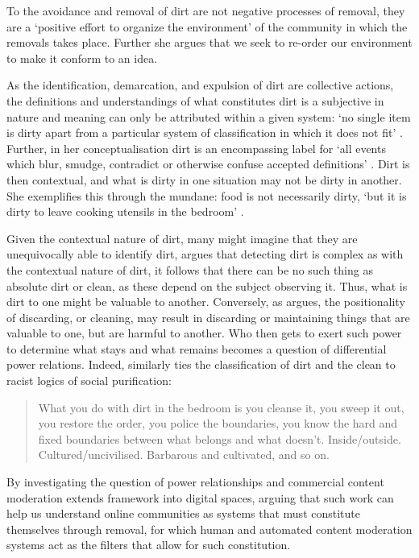 {To \citet{Douglas:1966} the avoidance and removal of dirt are not negative processes of removal, they are a `positive effort to organize the environment' \cite{Douglas:1966} of the community in which the removals takes place. Further she argues that we seek to re-order our environment to make it conform to an idea.

As the identification, demarcation, and expulsion of dirt are collective actions, the definitions and understandings of what constitutes dirt is a subjective in nature and meaning can only be attributed within a given system: `no single item is dirty apart from a particular system of classification in which it does not fit' \cite{Douglas:1966}. Further, in her conceptualisation dirt is an encompassing label for `all events which blur, smudge, contradict or otherwise confuse accepted definitions' \cite{Douglas:1966}. Dirt is then contextual, and what is dirty in one situation may not be dirty in another. She exemplifies this through the mundane: food is not necessarily dirty, `but it is dirty to leave cooking utensils in the bedroom' \cite{Douglas:1966}.

Given the contextual nature of dirt, many might imagine that they are unequivocally able to identify dirt, \citet{Douglas:1966} argues that detecting dirt is complex as with the contextual nature of dirt, it follows that there can be no such thing as absolute dirt or clean, as these depend on the subject observing it. Thus, what is dirt to one might be valuable to another. Conversely, as \citet{Lepawsky:2019} argues, the positionality of discarding, or cleaning, may result in discarding or maintaining things that are valuable to one, but are harmful to another. Who then gets to exert such power to determine what stays and what remains becomes a question of differential power relations. Indeed, \cite{Hall:1993} similarly ties the classification of dirt and the clean to racist logics of social purification:

\begin{quote}
  What you do with dirt in the bedroom is you cleanse it, you sweep it out, you restore the order, you police the boundaries, you know the hard and fixed boundaries between what belongs and what doesn't. Inside/outside. Cultured/uncivilised. Barbarous and cultivated, and so on. \cite[3]{Hall:1999}
\end{quote}

By investigating the question of power relationships and commercial content moderation \citet{Lepawsky:2019} extends \citet{Douglas:1966} framework into digital spaces, arguing that such work can help us understand online communities as systems that must constitute themselves through removal, for which human and automated content moderation systems act as the filters that allow for such constitution.

}
